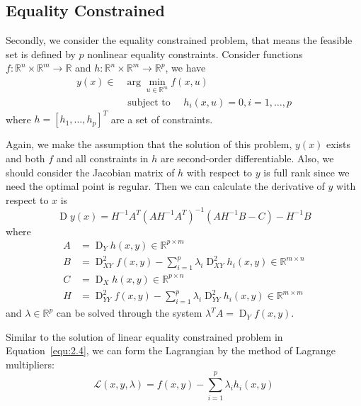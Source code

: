 \subsection{Equality Constrained}
Secondly, we consider the equality constrained problem, that means the feasible set is defined by $p$ nonlinear equality constraints. Consider functions $f: \mathbb{R}^n \times \mathbb{R}^m \rightarrow \mathbb{R}$ and $h: \mathbb{R}^n \times \mathbb{R}^m \rightarrow \mathbb{R}^p$, we have
\begin{equation}
    \begin{aligned} 
        y(x) \in & \arg \min _{u \in \mathbb{R}^{m}} f(x, u) \\ & \text { subject to } \quad h_{i}(x, u)=0, i=1, \ldots, p 
    \end{aligned}
\end{equation}
where $h = [h_1, \dots, h_p]^T$ are a set of constraints. 
\par Again, we make the assumption that the solution of this problem, $y(x)$ exists and both $f$ and all constraints in $h$ are second-order differentiable. Also, we should consider the Jacobian matrix of $h$ with respect to $y$ is full rank since we need the optimal point is regular. Then we can calculate the derivative of $y$ with respect to $x$ is
$$
\operatorname{D} y(x)=H^{-1} A^{T}\left(A H^{-1} A^{T}\right)^{-1}\left(A H^{-1} B-C\right)-H^{-1} B
$$
where
$$
\begin{aligned} 
    A &=\operatorname{D}_{Y} h(x, y) \in \mathbb{R}^{p \times m} \\ B &=\operatorname{D}_{X Y}^{2} f(x, y)-\sum_{i=1}^{p} \lambda_{i} \operatorname{D}_{X Y}^{2} h_{i}(x, y) \in \mathbb{R}^{m \times n} \\ C &=\operatorname{D}_{X} h(x, y) \in \mathbb{R}^{p \times n} \\ H &=\operatorname{D}_{Y Y}^{2} f(x, y)-\sum_{i=1}^{p} \lambda_{i} \operatorname{D}_{Y Y}^{2} h_{i}(x, y) \in \mathbb{R}^{m \times m} 
\end{aligned}
$$
and $\lambda \in \mathbb{R}^p$ can be solved through the system $\lambda ^T A = \operatorname{D}_Yf(x,y)$. 
\par Similar to the solution of linear equality constrained problem in Equation~\ref{equ:2.4}, we can form the Lagrangian by the method of Lagrange multipliers\citep{BD:14}:
\begin{equation}
    \mathcal{L}(x, y, \lambda)=f(x, y)-\sum_{i=1}^{p} \lambda_{i} h_{i}(x, y)
\end{equation}
